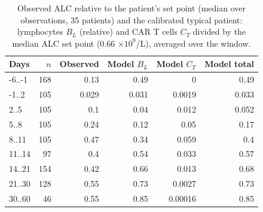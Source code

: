 \begin{table}[!htbp]
\centering
\small
\setlength{\tabcolsep}{3.5pt}
\caption{Observed ALC relative to the patient's set point (median over observations, 35 patients) and the calibrated typical patient: lymphocytes $B_L$ (relative) and CAR T cells $C_T$ divided by the median ALC set point (0.66 $\times10^9$/L), averaged over the window.}
\label{tab:alc}
\begin{tabular}{lrrrrr}
\toprule
Days & $n$ & Observed & Model $B_L$ & Model $C_T$ & Model total \\
\midrule
-6..-1 & 168 & 0.13 & 0.49 & 0 & 0.49 \\
-1..2 & 105 & 0.029 & 0.031 & 0.0019 & 0.033 \\
2..5 & 105 & 0.1 & 0.04 & 0.012 & 0.052 \\
5..8 & 105 & 0.24 & 0.12 & 0.05 & 0.17 \\
8..11 & 105 & 0.47 & 0.34 & 0.059 & 0.4 \\
11..14 & 97 & 0.4 & 0.54 & 0.033 & 0.57 \\
14..21 & 154 & 0.42 & 0.66 & 0.013 & 0.68 \\
21..30 & 128 & 0.55 & 0.73 & 0.0027 & 0.73 \\
30..60 & 46 & 0.55 & 0.85 & 0.00016 & 0.85 \\
\bottomrule
\end{tabular}
\end{table}
